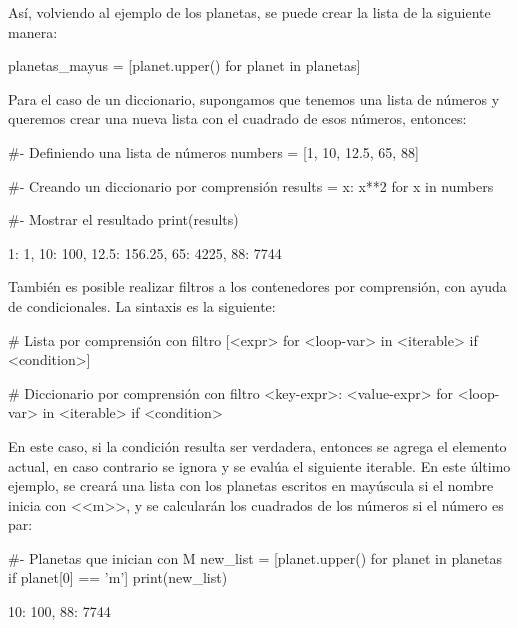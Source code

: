 Así, volviendo al ejemplo de los planetas, se puede crear la lista de la siguiente manera:

\begin{pyin}
planetas_mayus = [planet.upper() for planet in planetas]
\end{pyin}

Para el caso de un diccionario, supongamos que tenemos una lista de números y queremos crear una nueva lista con el cuadrado de esos números, entonces:

\begin{pyin}[]
#- Definiendo una lista de números
numbers = [1, 10, 12.5, 65, 88]

#- Creando un diccionario por comprensión
results = {x: x**2 for x in numbers}

#- Mostrar el resultado
print(results)
\end{pyin}
\begin{pyprint}
{1: 1, 10: 100, 12.5: 156.25, 65: 4225, 88: 7744}
\end{pyprint}

También es posible realizar filtros a los contenedores por comprensión, con ayuda de condicionales. La sintaxis es la siguiente:

\begin{pyin}[]
# Lista por comprensión con filtro
[<expr> for <loop-var> in <iterable> if <condition>]

# Diccionario por comprensión con filtro
{<key-expr>: <value-expr> for <loop-var> in <iterable> if <condition>}
\end{pyin}

En este caso, si la condición resulta ser verdadera, entonces se agrega el elemento actual, en caso contrario se ignora y se evalúa el siguiente iterable. En este último ejemplo, se creará una lista con los planetas escritos en mayúscula si el nombre inicia con <<m>>, y se calcularán los cuadrados de los números si el número es par:

\begin{pyin}[]
#- Planetas que inician con M
new_list = [planet.upper() for planet in planetas if planet[0] == 'm']
print(new_list)
\end{pyin}
\begin{pyprint}
\end{pyprint}

\begin{pyprint}
{10: 100, 88: 7744}
\end{pyprint}